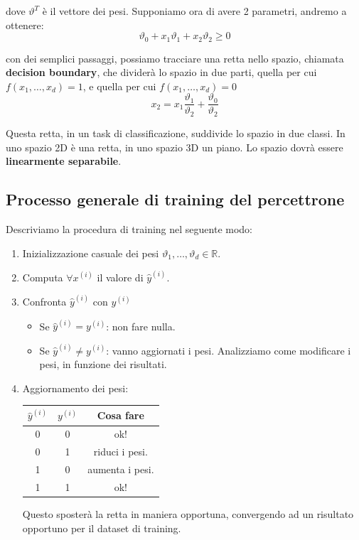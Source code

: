 dove $\vartheta^T$ è il vettore dei pesi. Supponiamo ora di avere 2 parametri, andremo a ottenere:
$$
\vartheta_0 + x_1\vartheta_1 + x_2\vartheta_2 \geq 0
$$

con dei semplici passaggi, possiamo tracciare una retta nello spazio, chiamata \textbf{decision boundary}, che dividerà lo spazio in due parti, quella per cui $f(x_1, \dots, x_d) = 1$, e quella per cui $f(x_1, \dots, x_d) = 0$
$$
x_2 = x_1\frac{\vartheta_1}{\vartheta_2} + \frac{\vartheta_0}{\vartheta_2}
$$

Questa retta, in un task di classificazione, suddivide lo spazio in due classi. In uno spazio 2D è una retta, in uno spazio 3D un piano. Lo spazio dovrà essere \textbf{linearmente separabile}.

\subsection{Processo generale di training del percettrone}
Descriviamo la procedura di training nel seguente modo:

\begin{enumerate}
	\item Inizializzazione casuale dei pesi $\vartheta_1, \dots, \vartheta_d \in \mathbb{R}$.
	\item Computa $\forall x^{(i)}$ il valore di $\hat{y}^{(i)}$.
	\item Confronta $\hat{y}^{(i)}$ con $y^{(i)}$
	\begin{itemize}
		\item Se  $\hat{y}^{(i)} = y^{(i)}$: non fare nulla.
		\item Se $\hat{y}^{(i)} \neq y^{(i)}$: vanno aggiornati i pesi. Analizziamo come modificare i pesi, in funzione dei risultati.
	\end{itemize}
	
	\item Aggiornamento dei pesi:
	
	\begin{center}
		\begin{tabular}{|c|c|c|}
			\hline
			$\hat{y}^{(i)}$ & $y^{(i)}$ & Cosa fare\\
			\hline
			0 & 0 & ok!\\
			0 & 1 & riduci i pesi.\\
			1 & 0 & aumenta i pesi.\\
			1 & 1 & ok!\\
			\hline
		\end{tabular}
	\end{center}
	
	Questo sposterà la retta in maniera opportuna, convergendo ad un risultato opportuno per il dataset di training.
\end{enumerate}

